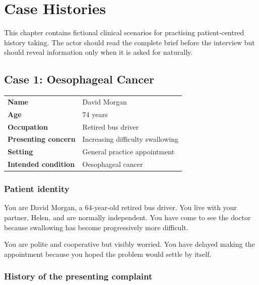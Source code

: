 
\chapter{Case Histories}
\label{chap:case-histories}

This chapter contains fictional clinical scenarios for practising
patient-centred history taking. The actor should read the complete
brief before the interview but should reveal information only when it
is asked for naturally.

\section{Case 1: Oesophageal Cancer}
\label{sec:case-oesophageal-cancer}

\begin{tabularx}{\textwidth}{@{}>{\bfseries}p{}Y@{}}
Name
    & David Morgan \\
Age
    & 74 years \\
Occupation
    & Retired bus driver \\
Presenting concern
    & Increasing difficulty swallowing \\
Setting
    & General practice appointment \\
Intended condition
    & Oesophageal cancer \\
\end{tabularx}


\subsection*{Patient identity}

You are David Morgan, a 64-year-old retired bus driver. You live with
your partner, Helen, and are normally independent. You have come to see the doctor because swallowing has become progressively more difficult.

You are polite and cooperative but visibly worried. You have delayed
making the appointment because you hoped the problem would settle by
itself.


\subsection*{History of the presenting complaint}

